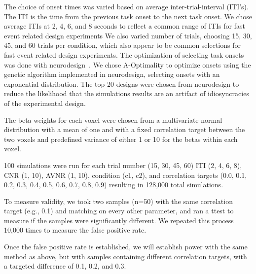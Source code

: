 \documentclass[10pt,letterpaper]{article}
\begin{document}
The choice of onset times was varied based on average inter-trial-interval (ITI's).
The ITI is the time from the previous task onset to the next task onset.
We chose average ITIs at 2, 4, 6, and 8 seconds to reflect a common range of ITIs
for fast event related design experiments
We also varied number of trials, choosing 15, 30, 45, and 60 trials per condition,
which also appear to be common selections for fast event related design experiments.
The optimization of selecting task onsets was done with neurodesign~\cite{Durnez2018}.
We chose A-Optimality to optimize onsets using the genetic algorithm implemented
in neurodesign, selecting onsets with an exponential distribution.
The top 20 designs were chosen from neurodesign to reduce the likelihood
that the simulations results are an artifact of idiosyncracies of the experimental design.

The beta weights for each voxel were chosen from a multivariate normal distribution
with a mean of one and with a fixed correlation target between the two voxels and predefined variance of either 1 or 10 for the betas
within each voxel.

100 simulations were run for each trial number (15, 30, 45, 60) ITI (2, 4, 6, 8), 
CNR (1, 10), AVNR (1, 10), condition (c1, c2), and correlation targets (0.0, 0.1, 0.2, 0.3, 0.4, 0.5, 0.6, 0.7, 0.8, 0.9)
resulting in 128,000 total simulations.

To measure validity, we took two samples (n=50) with the same correlation target (e.g., 0.1)
and matching on every other parameter, and ran a ttest to measure if the samples
were significantly different.
We repeated this process 10,000 times to measure the false positive rate.

Once the false positive rate is established, we will establish power with the same method as above,
but with samples containing different correlation targets, with a targeted difference of 0.1, 0.2, and 0.3.
\end{document}
